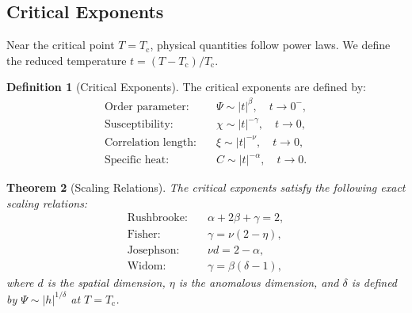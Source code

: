 \documentclass[11pt,twocolumn,a4paper]{article}
\newtheorem{theorem}{Theorem}[section]
\theoremstyle{definition}
\newtheorem{definition}[theorem]{Definition}
\newcommand{\Tc}{T_{\mathrm{c}}}
\begin{document}
\subsection{Critical Exponents}\label{sec:rg:exponents}

Near the critical point $T = \Tc$, physical quantities follow power laws. We define the
reduced temperature $t = (T - \Tc)/\Tc$.

\begin{definition}[Critical Exponents]\label{def:crit_exp}
The critical exponents are defined by:
\begin{align}
  \text{Order parameter:} & \quad \Psi \sim |t|^\beta, \quad t \to 0^-, \label{eq:beta} \\
  \text{Susceptibility:}  & \quad \chi \sim |t|^{-\gamma}, \quad t \to 0, \label{eq:gamma} \\
  \text{Correlation length:} & \quad \xi \sim |t|^{-\nu}, \quad t \to 0, \label{eq:nu} \\
  \text{Specific heat:}   & \quad C \sim |t|^{-\alpha}, \quad t \to 0. \label{eq:alpha}
\end{align}
\end{definition}

\begin{theorem}[Scaling Relations]\label{thm:scaling_relations}
The critical exponents satisfy the following exact scaling relations:
\begin{align}
  \text{Rushbrooke:} & \quad \alpha + 2\beta + \gamma = 2, \label{eq:rushbrooke} \\
  \text{Fisher:}     & \quad \gamma = \nu(2 - \eta), \label{eq:fisher_rel} \\
  \text{Josephson:}  & \quad \nu d = 2 - \alpha, \label{eq:josephson} \\
  \text{Widom:}      & \quad \gamma = \beta(\delta - 1), \label{eq:widom}
\end{align}
where $d$ is the spatial dimension, $\eta$ is the anomalous dimension, and $\delta$
is defined by $\Psi \sim |h|^{1/\delta}$ at $T = \Tc$.
\end{theorem}
\end{document}
